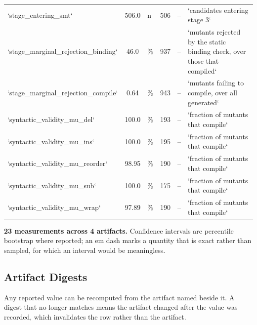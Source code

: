 \documentclass{article}
\begin{document}
\begin{table}[htbp]
{\begin{tabular}{lclcll}
`stage\_entering\_smt` & 506.0 & n & 506 & -- & `candidates entering stage 3` \\
`stage\_marginal\_rejection\_binding` & 46.0 & \% & 937 & -- & `mutants rejected by the static binding check, over those that compiled` \\
`stage\_marginal\_rejection\_compile` & 0.64 & \% & 943 & -- & `mutants failing to compile, over all generated` \\
`syntactic\_validity\_mu\_del` & 100.0 & \% & 193 & -- & `fraction of mutants that compile` \\
`syntactic\_validity\_mu\_ins` & 100.0 & \% & 195 & -- & `fraction of mutants that compile` \\
`syntactic\_validity\_mu\_reorder` & 98.95 & \% & 190 & -- & `fraction of mutants that compile` \\
`syntactic\_validity\_mu\_sub` & 100.0 & \% & 175 & -- & `fraction of mutants that compile` \\
`syntactic\_validity\_mu\_wrap` & 97.89 & \% & 190 & -- & `fraction of mutants that compile` \\
\bottomrule
\end{tabular}}
\end{table}

\textbf{23 measurements across 4 artifacts.} Confidence intervals are percentile bootstrap where reported; an em dash marks a quantity that is exact rather than sampled, for which an interval would be meaningless.


\subsection{Artifact Digests}
\begin{table}[htbp]
\centering
{}
\end{table}

Any reported value can be recomputed from the artifact named beside it. A digest that no longer matches means the artifact changed after the value was recorded, which invalidates the row rather than the artifact.


\par\vspace{0.5em}


\end{document}
